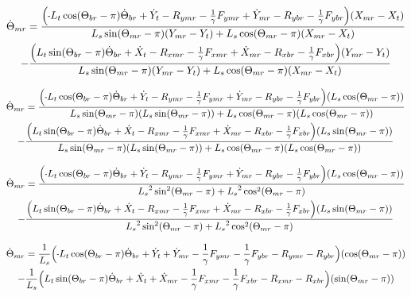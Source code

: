 \documentclass[11pt, landscape]{article}
\newcommand{\mn}{\scalebox{0.7}[1.0]{-}}
\begin{document}
\begin{multline}
\dot{\Theta}_{mr} =
\frac{\Big( \mn L_{t}\cos(\Theta_{br}-\pi) \dot{\Theta}_{br} + \dot{Y}_{t } - R_{ymr} - \frac{1}{\gamma}F_{ymr} + \dot{Y}_{mr} -R_{ybr} - \frac{1}{\gamma}F_{ybr}\Big) (X_{mr} - X_{t })}
{L_{s}\sin(\Theta_{mr}-\pi)(Y_{mr} - Y_{t}) + L_{s}\cos(\Theta_{mr}-\pi)(X_{mr} - X_{t })} \\
  - \frac{\Big(L_{t}\sin(\Theta_{br}-\pi) \dot{\Theta}_{br} + \dot{X}_{t } - R_{xmr} - \frac{1}{\gamma}F_{xmr} + \dot{X}_{mr} - R_{xbr} -\frac{1}{\gamma}F_{xbr} \Big)(Y_{mr} - Y_{t })}
  {L_{s}\sin(\Theta_{mr}-\pi)(Y_{mr} - Y_{t }) + L_{s}\cos(\Theta_{mr}-\pi)(X_{mr} - X_{t })}
\end{multline}

\begin{multline}
\dot{\Theta}_{mr} =
\frac{\Big( \mn L_{t}\cos(\Theta_{br}-\pi) \dot{\Theta}_{br} + \dot{Y}_{t } - R_{ymr} - \frac{1}{\gamma}F_{ymr} + \dot{Y}_{mr} -R_{ybr} - \frac{1}{\gamma}F_{ybr}\Big) (L_{s}\cos(\Theta_{mr}-\pi))}
{L_{s}\sin(\Theta_{mr}-\pi)(L_{s}\sin(\Theta_{mr}-\pi)) + L_{s}\cos(\Theta_{mr}-\pi)(L_{s}\cos(\Theta_{mr}-\pi))} \\
  - \frac{\Big(L_{t}\sin(\Theta_{br}-\pi) \dot{\Theta}_{br} + \dot{X}_{t } - R_{xmr} - \frac{1}{\gamma}F_{xmr} + \dot{X}_{mr} - R_{xbr} -\frac{1}{\gamma}F_{xbr} \Big)(L_{s}\sin(\Theta_{mr}-\pi))}
  {L_{s}\sin(\Theta_{mr}-\pi)(L_{s}\sin(\Theta_{mr}-\pi)) + L_{s}\cos(\Theta_{mr}-\pi)(L_{s}\cos(\Theta_{mr}-\pi))}
\end{multline}

\begin{multline}
\dot{\Theta}_{mr} =
\frac{\Big( \mn L_{t}\cos(\Theta_{br}-\pi) \dot{\Theta}_{br} + \dot{Y}_{t } - R_{ymr} - \frac{1}{\gamma}F_{ymr} + \dot{Y}_{mr} -R_{ybr} - \frac{1}{\gamma}F_{ybr}\Big) (L_{s}\cos(\Theta_{mr}-\pi))}
{{L_{s}}^2\sin^2(\Theta_{mr}-\pi) + {L_{s}}^2\cos^2(\Theta_{mr}-\pi)} \\
  - \frac{\Big(L_{t}\sin(\Theta_{br}-\pi) \dot{\Theta}_{br} + \dot{X}_{t } - R_{xmr} - \frac{1}{\gamma}F_{xmr} + \dot{X}_{mr} - R_{xbr} -\frac{1}{\gamma}F_{xbr} \Big)(L_{s}\sin(\Theta_{mr}-\pi))}
  {{L_{s}}^2\sin^2(\Theta_{mr}-\pi) + {L_{s}}^2\cos^2(\Theta_{mr}-\pi)}
\end{multline}

\begin{multline}
\dot{\Theta}_{mr} =
\frac{1}{L_{s}} \Big( \mn L_{t}\cos(\Theta_{br}-\pi) \dot{\Theta}_{br} + \dot{Y}_{t }  + \dot{Y}_{mr} - \frac{1}{\gamma}F_{ymr} - \frac{1}{\gamma}F_{ybr} - R_{ymr} - R_{ybr} \Big)(\cos(\Theta_{mr}-\pi))\\
  - \frac{1}{L_{s}}\Big(L_{t}\sin(\Theta_{br}-\pi) \dot{\Theta}_{br} + \dot{X}_{t } + \dot{X}_{mr} - \frac{1}{\gamma}F_{xmr} - \frac{1}{\gamma}F_{xbr} - R_{xmr} - R_{xbr} \Big)(\sin(\Theta_{mr}-\pi))
\end{multline}
\end{document}

